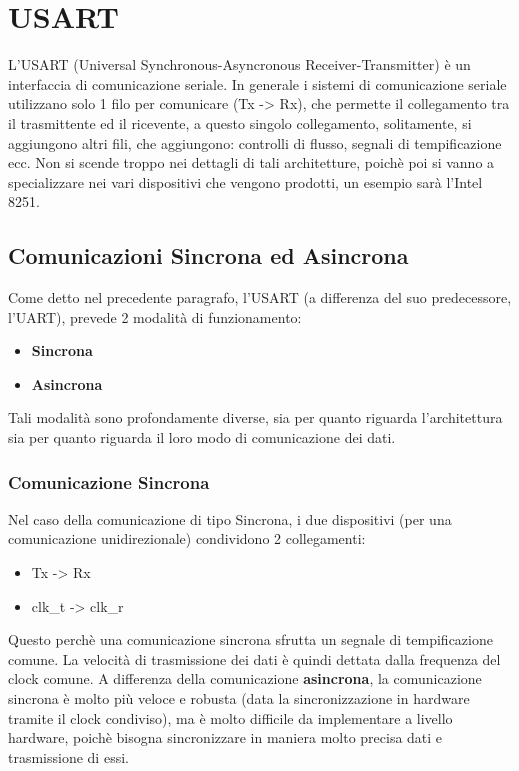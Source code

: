 \newpage
\section{USART}

L'USART (Universal Synchronous-Asyncronous Receiver-Transmitter) è un interfaccia di comunicazione seriale. In generale i sistemi di comunicazione seriale utilizzano solo 1 filo per comunicare (Tx -> Rx), che permette il collegamento tra il trasmittente ed il ricevente, a questo singolo collegamento, solitamente, si aggiungono altri fili, che aggiungono: controlli di flusso, segnali di tempificazione ecc.
Non si scende troppo nei dettagli di tali architetture, poichè poi si vanno a specializzare nei vari dispositivi che vengono prodotti, un esempio sarà l'Intel 8251.

\subsection{Comunicazioni Sincrona ed Asincrona}
Come detto nel precedente paragrafo, l'USART (a differenza del suo predecessore, l'UART), prevede 2 modalità di funzionamento:
\begin{itemize}
    \item \textbf{Sincrona}
    \item \textbf{Asincrona}
\end{itemize}
Tali modalità sono profondamente diverse, sia per quanto riguarda l'architettura sia per quanto riguarda il loro modo di comunicazione dei dati.

\subsubsection{Comunicazione Sincrona}
Nel caso della comunicazione di tipo Sincrona, i due dispositivi (per una comunicazione unidirezionale) condividono 2 collegamenti:
\begin{itemize}
    \item Tx -> Rx
    \item clk\_t -> clk\_r
\end{itemize}

Questo perchè una comunicazione sincrona sfrutta un segnale di tempificazione comune. La velocità di trasmissione dei dati è quindi dettata dalla frequenza del clock comune. A differenza della comunicazione \textbf{asincrona}, la comunicazione sincrona è molto più veloce e robusta (data la sincronizzazione in hardware tramite il clock condiviso), ma è molto difficile da implementare a livello hardware, poichè bisogna sincronizzare in maniera molto precisa dati e trasmissione di essi.


